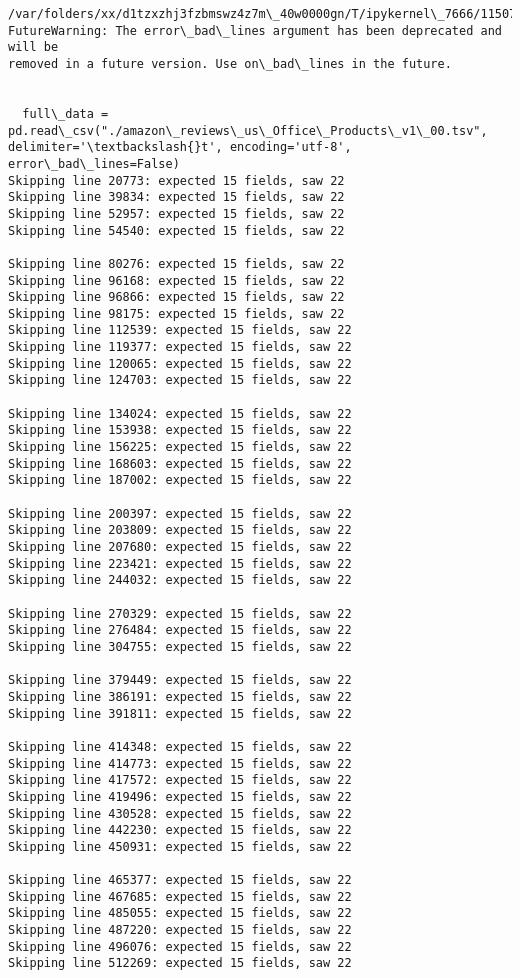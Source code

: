 \documentclass[11pt]{article}
\begin{document}
    \begin{Verbatim}[commandchars=\\\{\}]
/var/folders/xx/d1tzxzhj3fzbmswz4z7m\_40w0000gn/T/ipykernel\_7666/1150709939.py:2:
FutureWarning: The error\_bad\_lines argument has been deprecated and will be
removed in a future version. Use on\_bad\_lines in the future.


  full\_data = pd.read\_csv("./amazon\_reviews\_us\_Office\_Products\_v1\_00.tsv",
delimiter='\textbackslash{}t', encoding='utf-8', error\_bad\_lines=False)
Skipping line 20773: expected 15 fields, saw 22
Skipping line 39834: expected 15 fields, saw 22
Skipping line 52957: expected 15 fields, saw 22
Skipping line 54540: expected 15 fields, saw 22

Skipping line 80276: expected 15 fields, saw 22
Skipping line 96168: expected 15 fields, saw 22
Skipping line 96866: expected 15 fields, saw 22
Skipping line 98175: expected 15 fields, saw 22
Skipping line 112539: expected 15 fields, saw 22
Skipping line 119377: expected 15 fields, saw 22
Skipping line 120065: expected 15 fields, saw 22
Skipping line 124703: expected 15 fields, saw 22

Skipping line 134024: expected 15 fields, saw 22
Skipping line 153938: expected 15 fields, saw 22
Skipping line 156225: expected 15 fields, saw 22
Skipping line 168603: expected 15 fields, saw 22
Skipping line 187002: expected 15 fields, saw 22

Skipping line 200397: expected 15 fields, saw 22
Skipping line 203809: expected 15 fields, saw 22
Skipping line 207680: expected 15 fields, saw 22
Skipping line 223421: expected 15 fields, saw 22
Skipping line 244032: expected 15 fields, saw 22

Skipping line 270329: expected 15 fields, saw 22
Skipping line 276484: expected 15 fields, saw 22
Skipping line 304755: expected 15 fields, saw 22

Skipping line 379449: expected 15 fields, saw 22
Skipping line 386191: expected 15 fields, saw 22
Skipping line 391811: expected 15 fields, saw 22

Skipping line 414348: expected 15 fields, saw 22
Skipping line 414773: expected 15 fields, saw 22
Skipping line 417572: expected 15 fields, saw 22
Skipping line 419496: expected 15 fields, saw 22
Skipping line 430528: expected 15 fields, saw 22
Skipping line 442230: expected 15 fields, saw 22
Skipping line 450931: expected 15 fields, saw 22

Skipping line 465377: expected 15 fields, saw 22
Skipping line 467685: expected 15 fields, saw 22
Skipping line 485055: expected 15 fields, saw 22
Skipping line 487220: expected 15 fields, saw 22
Skipping line 496076: expected 15 fields, saw 22
Skipping line 512269: expected 15 fields, saw 22


\end{Verbatim}
\end{document}
